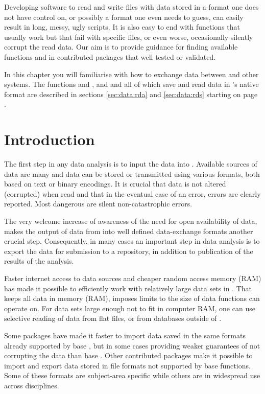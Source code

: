 \documentclass[krantz2]{krantz}\usepackage{knitr}%
\begin{document}
Developing software to read and write files with data stored in a format one does not have control on, or possibly a format one even needs to guess, can easily result in long, messy, ugly \Rlang scripts. It is also easy to end with functions that usually work but that fail with specific files, or even worse, occasionally silently corrupt the read data. Our aim is to provide guidance for finding available \Rlang functions and in contributed packages that well tested or validated.

In this chapter you will familiarise with how to exchange data between \Rlang and other systems. The functions  and , and  and   all of which save and read data in \Rlang's native format are described in sections \ref{sec:data:rda} and \ref{sec:data:rds} starting on page \pageref{sec:data:rda}.

\section{Introduction}

The first step in any data analysis is to input the data into \Rlang. Available sources of data are many and data can be stored or transmitted using various formats, both based on text or binary encodings. It is crucial that data is not altered (corrupted) when read and that in the eventual case of an error, errors are clearly reported. Most dangerous are silent non-catastrophic errors.

The very welcome increase of awareness of the need for open availability of data, makes the output of data from \Rlang into well defined data-exchange formats another crucial step. Consequently, in many cases an important step in data analysis is to export the data for submission to a repository, in addition to publication of the results of the analysis.

Faster internet access to data sources and cheaper random access memory (RAM) has made it possible to efficiently work with relatively large data sets in \Rlang. That \Rlang keeps all data in memory (RAM), imposes limits to the size of data \Rlang functions can operate on. For data sets large enough not to fit in computer RAM, one can use selective reading of data from flat files, or from databases outside of \Rlang.

Some \Rlang packages have made it faster to import data saved in the same formats already supported by base \Rlang, but in some cases providing weaker guarantees of not corrupting the data than base \Rlang. Other contributed packages make it possible to import and export data stored in file formats not supported by base \Rlang functions. Some of these formats are subject-area specific while others are in widespread use across disciplines.
\end{document}
